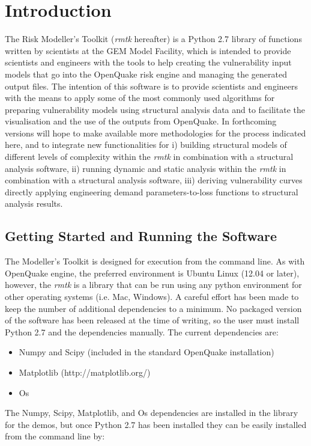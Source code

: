 \section{Introduction}
The Risk Modeller's Toolkit (\textit{rmtk} hereafter) is a Python 2.7 library of functions written by scientists at the GEM Model Facility, which is intended to provide scientists and engineers with the tools to help creating the vulnerability input models that go into the OpenQuake risk engine and managing the generated output files. The intention of this software is to provide scientists and engineers with the means to apply some of the most commonly used algorithms for preparing vulnerability models using structural analysis data and to facilitate the visualisation and the use of the outputs from OpenQuake. In forthcoming versions will hope to make available more methodologies for the process indicated here, and to integrate new functionalities for i) building structural models of different levels of complexity within the \textit{rmtk} in combination with a structural analysis software, ii) running dynamic and static analysis within the \textit{rmtk} in combination with a structural analysis software, iii) deriving vulnerability curves directly applying engineering demand parameters-to-loss functions to structural analysis results.

\subsection{Getting Started and Running the Software}
The Modeller’s Toolkit is designed for execution from the command line. As with OpenQuake engine, the preferred environment is Ubuntu Linux (12.04 or later), however, the \textit{rmtk} is a library that can be run using any python environment for other operating systems (i.e. Mac, Windows). A careful effort has been made to keep the number of additional dependencies to a minimum. No packaged version of the software has been released at the time of writing, so the user must install Python 2.7 and the dependencies manually. The current dependencies are:
\begin{itemize}
\item Numpy and Scipy (included in the standard OpenQuake installation)
\item Matplotlib (http://matplotlib.org/)
\item Os
\end{itemize}

The Numpy, Scipy, Matplotlib, and Os dependencies are installed in the library for the demos, but once Python 2.7 has been installed they can be easily installed from the command line by:

